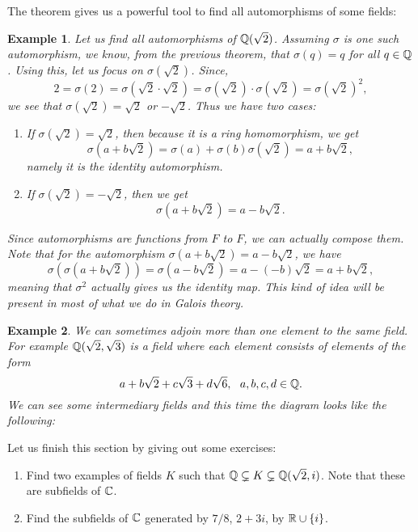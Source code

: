 \documentclass[12pt]{article}
\theoremstyle{plain}
\newtheorem{example}{Example}
\theoremstyle{definition}
\theoremstyle{remark}
\begin{document}
The theorem gives us a powerful tool to find all automorphisms of some fields:
\begin{example}
Let us find all automorphisms of $\mathbb{Q}(\sqrt{2})$. Assuming $\sigma$ is one such automorphism, we know, from the previous theorem, that $\sigma(q)=q$ for all $q\in \mathbb{Q}$. Using this, let us focus on $\sigma(\sqrt{2})$.
Since,
$$2=\sigma(2) = \sigma (\sqrt{2}\cdot \sqrt{2}) = \sigma(\sqrt{2})\cdot \sigma(\sqrt{2}) = \sigma(\sqrt{2})^2,$$
we see that $\sigma(\sqrt{2})=\sqrt{2}$ or $-\sqrt{2}$.
Thus we have two cases:
\begin{enumerate}
    \item If $\sigma(\sqrt{2})=\sqrt{2}$, then because it is a ring homomorphism, we get
    $$\sigma(a+b\sqrt{2})=\sigma(a)+\sigma(b)\sigma(\sqrt{2})=a+b\sqrt{2},$$ namely it is the identity automorphism.
    \item If $\sigma(\sqrt{2})=-\sqrt{2}$, then we get
    $$\sigma(a+b\sqrt{2}) = a-b\sqrt{2}.$$
\end{enumerate}
Since automorphisms are functions from $F$ to $F$, we can actually compose them. Note that for the automorphism $\sigma(a+b\sqrt{2}) = a-b\sqrt{2}$, we have
$$\sigma(\sigma(a+b\sqrt{2})) = \sigma(a-b\sqrt{2}) = a-(-b)\sqrt{2}=a+b\sqrt{2},$$
meaning that $\sigma^2$ actually gives us the identity map.
This kind of idea will be present in most of what we do in Galois theory.
\end{example}

\begin{example}
We can sometimes adjoin more than one element to the same field. For example $\mathbb{Q}(\sqrt{2}, \sqrt{3})$ is a field where each element consists of elements of the form
$$a+b\sqrt{2}+c\sqrt{3}+d\sqrt{6}, \:\:\:a,b,c,d\in \mathbb{Q}.$$
We can see some intermediary fields and this time the diagram looks like the following:


\end{example}

Let us finish this section by giving out some exercises:
\begin{enumerate}
    \item Find two examples of fields $K$ such that $\mathbb{Q} \subsetneq K \subsetneq \mathbb{Q}(\sqrt{2},i)$. Note that these are subfields of $\mathbb{C}$.
    \item Find the subfields of $\mathbb{C}$ generated by $7/8$, $2+3i$, by $\mathbb{R} \cup \{i\}$.
\end{enumerate}
\end{document}
